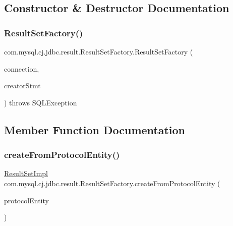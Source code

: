 \subsection{Constructor \& Destructor Documentation}
\mbox{\label{classcom_1_1mysql_1_1cj_1_1jdbc_1_1result_1_1_result_set_factory_aa9098e8cd6c53ba10c3de594a9b600d0}} 
\subsubsection{\texorpdfstring{Result\+Set\+Factory()}{ResultSetFactory()}}
{\footnotesize\ttfamily com.\+mysql.\+cj.\+jdbc.\+result.\+Result\+Set\+Factory.\+Result\+Set\+Factory (\begin{DoxyParamCaption}\item[{\mbox{\hyperlink{interfacecom_1_1mysql_1_1cj_1_1jdbc_1_1_jdbc_connection}{Jdbc\+Connection}}}]{connection,  }\item[{\mbox{\hyperlink{classcom_1_1mysql_1_1cj_1_1jdbc_1_1_statement_impl}{Statement\+Impl}}}]{creator\+Stmt }\end{DoxyParamCaption}) throws S\+Q\+L\+Exception}



\subsection{Member Function Documentation}
\mbox{\label{classcom_1_1mysql_1_1cj_1_1jdbc_1_1result_1_1_result_set_factory_a5638ebeb2a785cacf994cadafbfbaac7}} 
\subsubsection{\texorpdfstring{create\+From\+Protocol\+Entity()}{createFromProtocolEntity()}}
{\footnotesize\ttfamily \mbox{\hyperlink{classcom_1_1mysql_1_1cj_1_1jdbc_1_1result_1_1_result_set_impl}{Result\+Set\+Impl}} com.\+mysql.\+cj.\+jdbc.\+result.\+Result\+Set\+Factory.\+create\+From\+Protocol\+Entity (\begin{DoxyParamCaption}\item[{\mbox{\hyperlink{interfacecom_1_1mysql_1_1cj_1_1protocol_1_1_protocol_entity}{Protocol\+Entity}}}]{protocol\+Entity }\end{DoxyParamCaption})}


